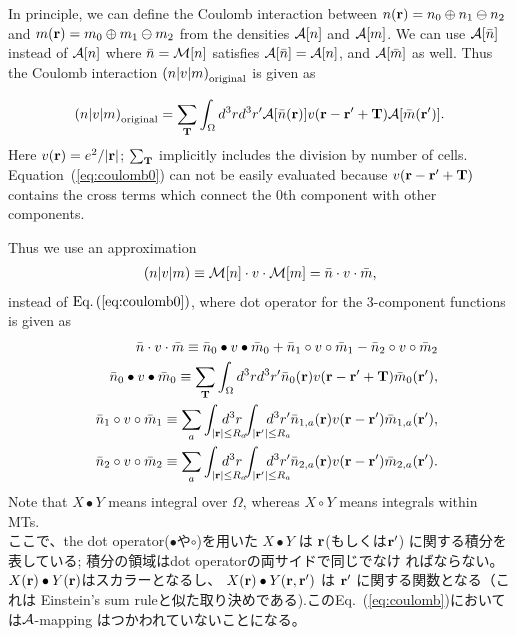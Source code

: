 \documentclass[twocolumn,showpacs,preprintnumbers,amsmath,amssymb,floatfix]{revtex4-1}
\newcommand{\bfr}{{\bf r}}
\newcommand{\bfT}{{\bf T}}
\newcommand{\ooplus}{\oplus}
\newcommand{\oominus}{\ominus}
\def\calR{{\cal A}}
\newcommand{\req}[1]{\mbox{Eq.~\!(\ref{#1})}}
\def\MM{{\cal M}}
\def\inta{\int_{|\bfr|\leq R_a}\!\!\!\!\!\!\!\!\!\!\!\!}
\def\intad{\int_{|\bfr'|\leq R_a}\!\!\!\!\!\!\!\!\!\!\!\!}
\begin{document}
In principle, we can define the Coulomb interaction
between $n(\bfr)=n_0\ooplus n_1 \oominus n_2$ and $m(\bfr)=m_0 \ooplus
m_1 \oominus m_2$ from the densities $\calR[n]$ and $\calR[m]$.  We can
use $\calR[\bar{n}]$ instead of $\calR[n]$ where $\bar{n}=\MM[n]$
satisfies $\calR[\bar{n}]=\calR[n]$, and $\calR[\bar{m}]$ as well.  Thus
the Coulomb interaction $\left(n|v|m\right)_{\rm original}$ is given as
\begin{widetext}
\begin{eqnarray}
\left(n|v|m\right)_{\rm original}=\sum_{\bfT} \int_\Omega d^3r d^3r' 
\calR[\bar{n}(\bfr)] v(\bfr-\bfr'+\bfT) \calR[\bar{m}(\bfr')].
\label{eq:coulomb0}
\end{eqnarray}
Here $v(\bfr)=e^2/|\bfr|$; $\sum_{\bfT}$ implicitly includes the
division by number of cells. Equation~(\ref{eq:coulomb0}) can not be
easily evaluated because $v(\bfr-\bfr'+\bfT)$ contains the cross terms
which connect the 0th component with other components.

Thus we use an approximation 
\begin{eqnarray}
\left(n|v|m\right)\equiv\MM[n] \cdot v \cdot \MM[m] = \bar{n} \cdot v \cdot \bar{m}, \label{eq:coulomb}
\end{eqnarray}
instead of $\req{eq:coulomb0}$, where dot operator for the 3-component
functions is given as
\begin{eqnarray}
&&\bar{n} \cdot v \cdot \bar{m} \equiv
\bar{n}_0 \bullet v \bullet \bar{m}_0 + \bar{n}_{1} \circ v \circ
\bar{m}_{1} - \bar{n}_{2} \circ v \circ \bar{m}_{2}\\
&&\bar{n}_0 \bullet v \bullet \bar{m}_0 \equiv \sum_{\bfT} \int_\Omega d^3r d^3r' \bar{n}_0(\bfr)v(\bfr-\bfr'+\bfT) \bar{m}_0(\bfr'), \label{eq:n0vn0}\\
&&\bar{n}_1 \circ v \circ \bar{m}_1 \equiv 
\sum_a \inta d^3r \intad d^3r' \bar{n}_{1,a}(\bfr)v(\bfr-\bfr') \bar{m}_{1,a}(\bfr'), \label{eq:n1vn1}\\
&&\bar{n}_2 \circ v \circ \bar{m}_2 \equiv \sum_a \inta d^3r \intad d^3r' \bar{n}_{2,a}(\bfr)v(\bfr-\bfr') \bar{m}_{2,a}(\bfr'). \label{eq:n2vn2}
\end{eqnarray}
Note that $X \bullet Y$ means integral over $\Omega$, whereas $X \circ
Y$ means integrals within MTs.\\
ここで、the dot operator($\bullet$や$\circ$)を用いた $X \bullet Y$ は $\bfr$(もしくは$\bfr'$)
に関する積分を表している; 積分の領域はdot operatorの両サイドで同じでなけ
ればならない。 $X(\bfr) \bullet Y(\bfr)$はスカラーとなるし、
$X(\bfr) \bullet Y(\bfr,\bfr')$ は $\bfr'$ に関する関数となる（これは
Einstein's sum ruleと似た取り決めである).この\req{eq:coulomb}においては$\calR$-mapping
はつかわれていないことになる。


\end{widetext}
\end{document}
